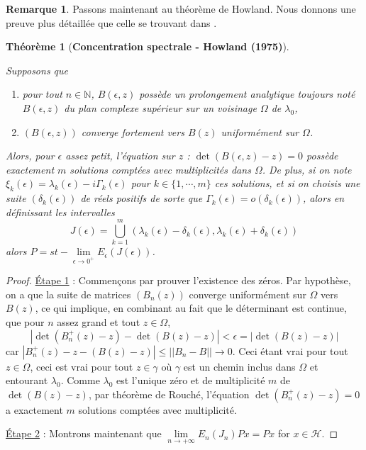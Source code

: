 \documentclass[12pt,openany,a4paper, titlepage]{article}
\newcommand{\lp}{\left(}
\newcommand{\rp}{\right)}
\newcommand{\N}{\mathbb{N}}
\newcommand{\HH}{\mathcal{H}}
\newtheorem{theo}{Théorème}
\theoremstyle{definition}
\theoremstyle{definition}
\theoremstyle{definition}
\theoremstyle{definition}
\theoremstyle{definition}
\newtheorem{rem}{Remarque}
\theoremstyle{definition}
\begin{document}
\begin{rem}
Passons maintenant au théorème de Howland. Nous donnons une preuve plus détaillée que celle se trouvant dans \cite{HOWLAND1975415}.

\begin{theo}[\textbf{Concentration spectrale - Howland (1975)}]
\,

Supposons que \begin{enumerate}
    \item[(1)] pour tout $n\in\N$, $B(\epsilon,z)$ possède un prolongement analytique toujours noté $B(\epsilon,z)$ du plan complexe supérieur sur un voisinage $ \Omega$ de $\lambda_0$,
    \item[(2)] $\lp B(\epsilon,z)\rp$ converge fortement vers $B(z)$ uniformément sur $\Omega$.
\end{enumerate}
Alors, pour $\epsilon$ assez petit, l'équation sur $z$ : $\det(B(\epsilon,z) -z) = 0 $ possède exactement $m$ solutions comptées avec multiplicités dans $\Omega$. De plus, si on note $\xi_k(\epsilon) = \lambda_k(\epsilon) - i \Gamma_k(\epsilon)$ pour $k\in\{1,\cdots,m\}$ ces solutions, et si on choisis une suite $(\delta_k(\epsilon))$ de réels positifs de sorte que $\Gamma_k(\epsilon) = o(\delta_k(\epsilon))$, alors en définissant les intervalles 
$$ J(\epsilon) = \bigcup_{k=1}^m (\lambda_k(\epsilon) - \delta_k(\epsilon),\lambda_k(\epsilon) + \delta_k(\epsilon))$$ alors $P = st-\lim\limits_{\epsilon\rightarrow 0^+} E_\epsilon(J(\epsilon))$.
\end{theo}

\begin{proof}
\underline{Étape 1} : Commençons par prouver l'existence des zéros. Par hypothèse, on a que la suite de matrices $(B_n(z))$ converge uniformément sur $\Omega$ vers $B(z)$, ce qui implique, en combinant au fait que le déterminant est continue, que pour $n$ assez grand et tout $z\in\Omega$, $$ |\det (B_n^+(z) - z) - \det (B(z) - z)| < \epsilon = |\det (B(z) - z)| $$ car $|B_n^+(z) - z - (B(z) - z)| \leq ||B_n - B|| \rightarrow 0$. Ceci étant vrai pour tout $z\in\Omega$, ceci est vrai pour tout $z\in\gamma$ où $\gamma$ est un chemin inclus dans $\Omega$ et entourant $\lambda_0$. Comme $\lambda_0$ est l'unique zéro et de multiplicité $m$ de $\det (B(z) - z)$, par théorème de Rouché, l'équation $\det(B_n^+(z) -z) = 0$ a exactement $m$ solutions comptées avec multiplicité. 

\underline{Étape 2} : Montrons maintenant que $\lim\limits_{n\rightarrow +\infty} E_n(J_n) Px = Px$ for $x\in\HH$.




\end{proof}
\end{rem}
\end{document}
